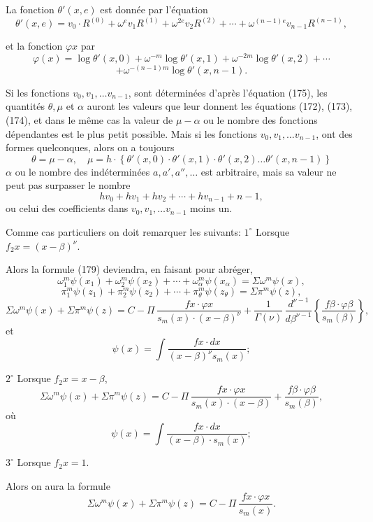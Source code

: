\documentclass{article}
\begin{document}
La fonction $\theta'(x,e)$ est donnée par l'équation
\[ \theta'(x,e) = v_0 \cdot R^{(0)}+\omega^{e}v_1 R^{(1)}+\omega^{2e}v_2 R^{(2)}+\cdots+\omega^{(n-1)e}v_{n-1}R^{(n-1)}, \tag{184} \]

et la fonction $\varphi x$ par
\[ \varphi(x) = \log\theta'(x,0)+\omega^{-m}\log\theta'(x,1)+\omega^{-2m}\log\theta'(x,2)+\cdots \]
\[ +\omega^{-(n-1)m}\log\theta'(x,n-1). \tag{185} \]

Si les fonctions $v_0, v_1, \ldots v_{n-1}$, sont déterminées d'après l'équation (175), les quantités $\theta, \mu$ et $\alpha$ auront les valeurs que leur donnent les équations (172), (173), (174), et dans le même cas la valeur de $\mu-\alpha$ ou le nombre des fonctions dépendantes est le plus petit possible. Mais si les fonctions $v_0, v_1, \ldots v_{n-1}$, ont des formes quelconques, alors on a toujours
\[ \theta = \mu-\alpha, \quad \mu = h \cdot \left\{\theta'(x,0) \cdot \theta'(x,1) \cdot \theta'(x,2) \ldots \theta'(x,n-1)\right\} \tag{186} \]
$\alpha$ ou le nombre des indéterminées $a, a', a'', \ldots$ est arbitraire, mais sa valeur ne peut pas surpasser le nombre
\[ hv_0+hv_1+hv_2+\cdots+hv_{n-1}+n-1, \]
ou celui des coefficients dans $v_0, v_1, \ldots v_{n-1}$ moins un.

Comme cas particuliers on doit remarquer les suivants:
$1^\circ$ Lorsque $f_2 x = (x-\beta)^{\nu}$.

Alors la formule (179) deviendra, en faisant pour abréger,
\[ \omega_1^{m}\psi(x_1)+\omega_2^{m}\psi(x_2)+\cdots+\omega_\alpha^{m}\psi(x_\alpha) = \Sigma\omega^{m}\psi(x), \]
\[ \pi_1^{m}\psi(z_1)+\pi_2^{m}\psi(z_2)+\cdots+\pi_\theta^{m}\psi(z_\theta) = \Sigma\pi^{m}\psi(z), \]
\[ \Sigma\omega^{m}\psi(x)+\Sigma\pi^{m}\psi(z) = C-\Pi\,\frac{f x \cdot \varphi x}{s_m(x) \cdot (x-\beta)^{\nu}} + \frac{1}{\Gamma(\nu)}\,\frac{d^{\nu-1}}{d\beta^{\nu-1}} \left\{ \frac{f\beta \cdot \varphi\beta}{s_m(\beta)} \right\}, \]
et
\[ \psi(x) = \int \frac{f x \cdot dx}{(x-\beta)^{\nu} s_m(x)}; \]

$2^\circ$ Lorsque $f_2 x = x-\beta$,
\[ \Sigma\omega^{m}\psi(x)+\Sigma\pi^{m}\psi(z) = C-\Pi\,\frac{f x \cdot \varphi x}{s_m(x) \cdot (x-\beta)} + \frac{f\beta \cdot \varphi\beta}{s_m(\beta)}, \tag{188} \]
où
\[ \psi(x) = \int \frac{f x \cdot dx}{(x-\beta) \cdot s_m(x)}; \]

$3^\circ$ Lorsque $f_2 x = 1$.

Alors on aura la formule
\[ \Sigma\omega^{m}\psi(x)+\Sigma\pi^{m}\psi(z) = C-\Pi\,\frac{f x \cdot \varphi x}{s_m(x)}. \tag{189} \]
\end{document}
